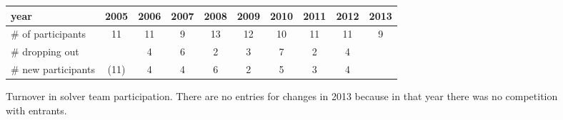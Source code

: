 \documentclass{eptcs}
\begin{document}
\begin{figure}
\centering
\begin{tabular}{|l|ccccccccc|}
\hline
year                & 2005 & 2006 & 2007 & 2008 & 2009 & 2010 & 2011 & 2012 & 2013 \\ \hline
\# of participants  & 11   & 11   & 9    & 13   & 12   & 10   & 11   & 11   & 9   \\ \hline
\# dropping out     &      &  4   & 6    &  2   &  3   &  7   &  2   &  4   & \\ \hline
\# new participants & (11) &  4   & 4    &  6   &  2   &  5   &  3   &  4   &      \\ \hline
\end{tabular}
\caption{Turnover in solver team participation. There are no entries for changes in 2013 because in that year there was no competition with entrants.}
\label{Fig:participation}
\end{figure}
\end{document}
